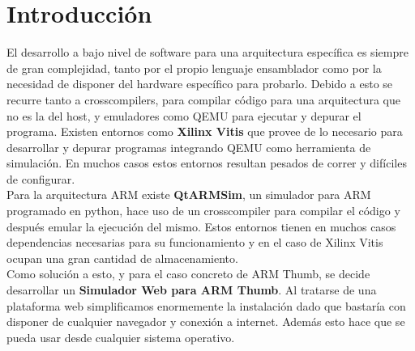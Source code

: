 \section{Introducción}
{
    El desarrollo a bajo nivel de software para una arquitectura específica es siempre de gran complejidad, tanto por el propio lenguaje ensamblador como por la necesidad de disponer del hardware
    específico para probarlo. Debido a esto se recurre tanto a crosscompilers, para compilar código para una arquitectura que no es la del host, y emuladores como QEMU para ejecutar y depurar el programa.
    Existen entornos como \textbf{Xilinx Vitis} que provee de lo necesario para desarrollar y depurar programas integrando QEMU como herramienta de simulación.
    En muchos casos estos entornos resultan pesados de correr y difíciles de configurar. \\

    Para la arquitectura ARM existe \textbf{QtARMSim}, un simulador para ARM programado en python, hace uso de un crosscompiler para compilar el código y después emular la ejecución del mismo.
    Estos entornos tienen en muchos casos dependencias necesarias para su funcionamiento y en el caso de Xilinx Vitis ocupan una gran cantidad de almacenamiento. \\
    

    Como solución a esto, y para el caso concreto de ARM Thumb, se decide desarrollar un \textbf{Simulador Web para ARM Thumb}. Al tratarse de una plataforma web simplificamos enormemente la instalación dado que bastaría con disponer de cualquier navegador y conexión a internet. Además esto hace que se pueda usar desde cualquier sistema operativo. \\

}
